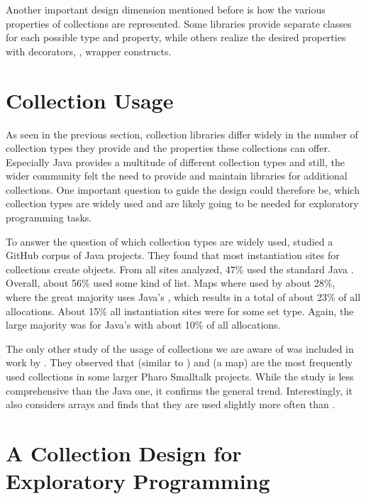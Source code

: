 \documentclass[sigconf, 10pt]{acmart}
\begin{document}
Another important design dimension mentioned before is
how the various properties of collections are represented.
Some libraries provide separate classes for each possible type and property,
while others realize the desired properties with decorators,
\ie, wrapper constructs.

\section{Collection Usage}
\label{sec:usage}

As seen in the previous section,
collection libraries differ widely
in the number of collection types they provide
and the properties these collections can offer.
Especially Java provides a multitude of different collection types and still,
the wider community felt the need to provide and maintain libraries
for additional collections.
One important question to guide the design could therefore be,
which collection types are widely used and are likely going to be needed
for exploratory programming tasks.

To answer the question of which collection types are widely used,
\citet{Costa:2017:ESU} studied a GitHub corpus of Java projects\citep{6624029}.
They found that most instantiation sites for collections
create  objects.
From all sites analyzed, 47\% used the standard Java .
Overall, about 56\% used some kind of list.
Maps where used by about 28\%,
where the great majority uses Java's ,
which results in a total of about 23\% of all allocations.
About 15\% all instantiation sites were for some set type.
Again, the large majority was for Java's 
with about 10\% of all allocations.

The only other study of the usage of collections we are aware of
was included in work by \citet[sec. 9.2]{Bergel:2018}.
They observed that  (similar to )
and  (a map) are the most frequently used collections
in some larger Pharo Smalltalk projects.
While the study is less comprehensive than the Java one,
it confirms the general trend.
Interestingly, it also considers arrays
and finds that they are used slightly more often than .


\section{A Collection Design for Exploratory Programming}
\end{document}

